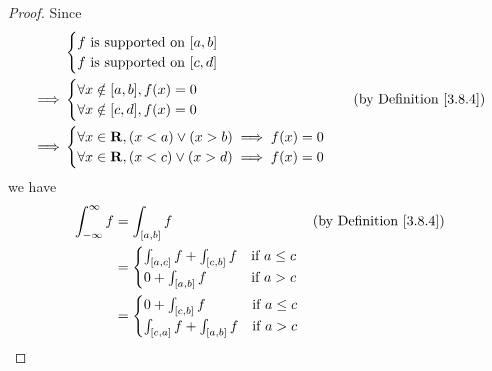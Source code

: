 \begin{proof}
    Since
    \begin{align*}
                 & \begin{cases}
                       f \text{ is supported on } [a, b] \\
                       f \text{ is supported on } [c, d]
                   \end{cases}                                               \\
        \implies & \begin{cases}
                       \forall x \notin [a, b], f(x) = 0 \\
                       \forall x \notin [c, d], f(x) = 0
                   \end{cases}                                & \text{(by Definition \ref{3.8.4})} \\
        \implies & \begin{cases}
                       \forall x \in \mathbf{R}, (x < a) \lor (x > b) \implies f(x) = 0 \\
                       \forall x \in \mathbf{R}, (x < c) \lor (x > d) \implies f(x) = 0
                   \end{cases}
    \end{align*}
    we have
    \begin{align*}
        \int_{-\infty}^\infty f & = \int_{[a, b]} f                                                                                                            & \text{(by Definition \ref{3.8.4})} \\
                                & = \begin{cases}
                                        \int_{[a, c]} f + \int_{[c, b]} f & \text{if } a \leq c \\
                                        0 + \int_{[a, b]} f               & \text{if } a > c
                                    \end{cases}                                       \\
                                & = \begin{cases}
                                        0 + \int_{[c, b]} f               & \text{if } a \leq c \\
                                        \int_{[c, a]} f + \int_{[a, b]} f & \text{if } a > c
                                    \end{cases}                                       \\

\end{align*}
\end{proof}
